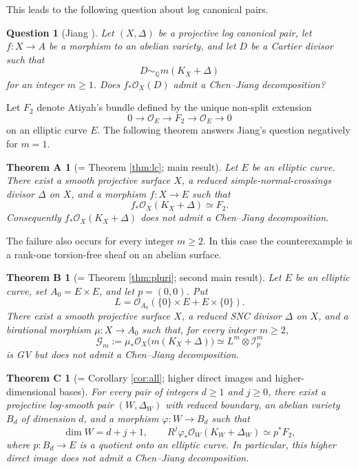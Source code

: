 \documentclass[11pt,letterpaper]{article}
\theoremstyle{paper}
\newtheorem*{theoremA}{Theorem A}
\newtheorem*{theoremB}{Theorem B}
\newtheorem*{theoremC}{Theorem C}
\newtheorem*{question}{Question}
\newcommand{\OO}{\mathcal O}
\newcommand{\GG}{\mathcal G}
\newcommand{\II}{\mathcal I}
\newcommand{\QQ}{\mathbb Q}
\newcommand{\simQ}{\sim_{\QQ}}
\begin{document}
This leads to the following question about log canonical pairs.
\begin{question}[Jiang {\cite[Question 3.4]{Jiang}}]
Let $(X,\Delta)$ be a projective log canonical pair, let $f:X\to A$ be a morphism to an abelian variety, and let $D$ be a Cartier divisor such that
\[
D\simQ m(K_X+\Delta)
\]
for an integer $m\ge1$. Does $f_*\OO_X(D)$ admit a Chen--Jiang decomposition?
\end{question}

Let $F_2$ denote Atiyah's bundle defined by the unique non-split extension
\[
0\longrightarrow\OO_E\longrightarrow F_2\longrightarrow\OO_E\longrightarrow0
\]
on an elliptic curve $E$. The following theorem answers Jiang's question negatively for $m=1$.

\begin{theoremA}[= Theorem \ref{thm:lc}; main result]
Let $E$ be an elliptic curve. There exist a smooth projective surface $X$, a reduced simple-normal-crossings divisor $\Delta$ on $X$, and a morphism $f:X\to E$ such that
\[
f_*\OO_X(K_X+\Delta)\simeq F_2.
\]
Consequently $f_*\OO_X(K_X+\Delta)$ does not admit a Chen--Jiang decomposition.
\end{theoremA}

The failure also occurs for every integer $m\ge2$. In this case the counterexample is a rank-one torsion-free sheaf on an abelian surface.

\begin{theoremB}[= Theorem \ref{thm:pluri}; second main result]
Let $E$ be an elliptic curve, set $A_0=E\times E$, and let $p=(0,0)$. Put
\[
L=\OO_{A_0}(\{0\}\times E+E\times\{0\}).
\]
There exist a smooth projective surface $X$, a reduced SNC divisor $\Delta$ on $X$, and a birational morphism $\mu:X\to A_0$ such that, for every integer $m\ge2$,
\[
\GG_m:=\mu_*\OO_X\bigl(m(K_X+\Delta)\bigr)\simeq L^m\otimes\II_p^m
\]
is GV but does not admit a Chen--Jiang decomposition.
\end{theoremB}

\begin{theoremC}[= Corollary \ref{cor:all}; higher direct images and higher-dimensional bases]
For every pair of integers $d\ge1$ and $j\ge0$, there exist a projective log-smooth pair $(W,\Delta_W)$ with reduced boundary, an abelian variety $B_d$ of dimension $d$, and a morphism $\varphi:W\to B_d$ such that
\[
\dim W=d+j+1,\qquad R^j\varphi_*\OO_W(K_W+\Delta_W)\simeq p^*F_2,
\]
where $p:B_d\to E$ is a quotient onto an elliptic curve. In particular, this higher direct image does not admit a Chen--Jiang decomposition.
\end{theoremC}
\end{document}
